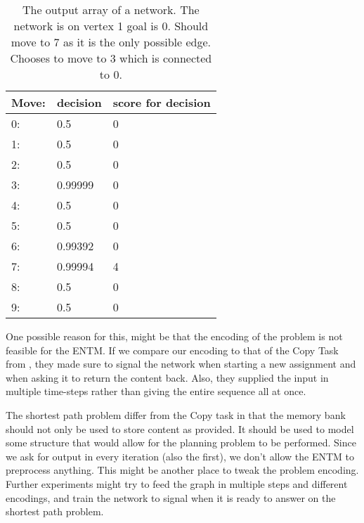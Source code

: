 \begin{table}[H]
	\centering
	\begin{tabular}{|l|l|l|}
		\hline
		Move:&	decision & score for decision\\
		\hline
		0:&	0.5 & 0 \\
		\hline
		1:&	0.5	& 0\\
		\hline
		2:&	0.5	& 0\\
		\hline
		3:&	0.99999 & 0\\
		\hline
		4:&	0.5	& 0\\
		\hline
		5:&	0.5	& 0\\
		\hline
		6:&	0.99392 & 0\\
		\hline
		7:&	0.99994 & 4\\
		\hline
		8:&	0.5 & 0	\\
		\hline
		9:&	0.5 & 0\\
		\hline
	\end{tabular}
	\caption{The output array of a network. The network is on vertex 1 goal is 0. Should move to 7 as it is the only possible edge. Chooses to move to 3 which is connected to 0.}
	\label{table:analysis:1}
\end{table}

\newpar One possible reason for this, might be that the encoding of the problem is not feasible for the ENTM. If we compare our encoding to that of the Copy Task from \cite{greve2016evolving}, they made sure to signal the network when starting a new assignment and when asking it to return the content back. Also, they supplied the input in multiple time-steps rather than giving the entire sequence all at once.

\newpar The shortest path problem differ from the Copy task in that the memory bank should not only be used to store content as provided. It should be used to model some structure that would allow for the planning problem to be performed. Since we ask for output in every iteration (also the first), we don't allow the ENTM to preprocess anything. This might be another place to tweak the problem encoding. Further experiments might try to feed the graph in multiple steps and different encodings, and train the network to signal when it is ready to answer on the shortest path problem.
